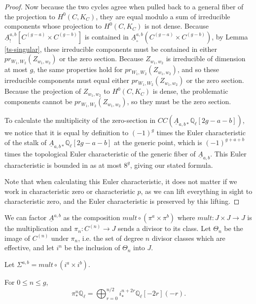 \begin{proof}
Now because the two cycles agree when pulled back to a general fiber of the projection to $H^0(C, K_C)$, they are equal modulo a sum of irreducible components whose projection to $H^0(C, K_C)$ is not dense. Because $ \underline{A}^{a,b}_! [ C^{(g-a)} \times C^{(g-b) }]$ is contained in $ \underline{A}^{a,b}_{\circ} ( C^{(g-a)} \times C^{(g-b) })$, by Lemma \ref{ts-singular}, these irreducible components must be contained in either $pr_{W_1,W_2} (Z_{w_1,w_2})$ or the zero section. Because $Z_{w_1,w_2}$ is irreducible of dimension at most $g$, the same properties hold for $pr_{W_1,W_2} (Z_{w_1,w_2})$, and so these irreducible components must equal either $pr_{W_1,W_2} (Z_{w_1,w_2})$ or the zero section. Because the projection of $Z_{w_1,w_2}$ to $H^0(C,K_C)$ is dense, the problematic  components cannot be $pr_{W_1,W_2} (Z_{w_1,w_2})$, so they must be the zero section.


To calculate the multiplicity of the zero-section in $CC ( \underline{A}_{a,b *} \mathbb Q_\ell [ 2g-a-b] )$, we notice that it is equal by definition to $(-1)^g$ times the Euler characteristic of the stalk of $\underline{A}_{a,b *} \mathbb Q_\ell [ 2g-a-b]$ at the generic point, which is $(-1)^{g+ a+b}$ times the topological Euler characteristic of the generic fiber of $\underline{A}_{a,b}$. This Euler characteristic is bounded in \citep[ Proposition 3.16]{TS} as at most $8^g$, giving our stated formula.

Note that when calculating this Euler characteristic, it does not matter if we work in characteristic zero or characteristic $p$, as we can lift everything in sight to characteristic zero, and the Euler characteristic is preserved by this lifting. \end{proof}

We can factor $\underline{A}^{a,b}$ as the composition $mult \circ (\pi^a \times \pi^b)$ where $mult: J \times J \to J$ is the multiplication and $\pi_n : C^{(n)}\to J$ sends a divisor to its class. Let $\Theta_n$ be the image of $C^{(n)}$ under $\pi_n$, i.e. the set of degree $n$ divisor classes which are effective, and let $i^n$ be the inclusion of $\Theta_n$ into $J$.

Let $\Sigma^{a,b} = mult \circ (i^a \times i^b) $.

\begin{lemma}
\notready\label{ts-decomposition} For $0 \leq n \leq g$, \[ \pi^n_* \mathbb Q_\ell= \bigoplus_{r=0}^{n/2} i^{n+2r}_* \mathbb Q_\ell [-2r] (-r) .\] \end{lemma}

